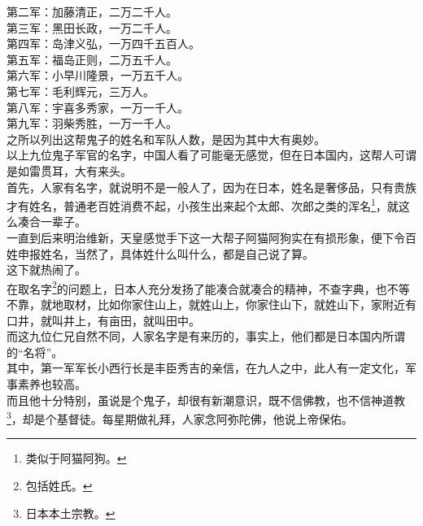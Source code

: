 \begin{multicols}{\theparacolNo}
第二军：加藤清正，二万二千人。\\

第三军：黑田长政，一万二千人。\\

第四军：岛津义弘，一万四千五百人。\\

第五军：福岛正则，二万五千人。\\

第六军：小早川隆景，一万五千人。\\

第七军：毛利辉元，三万人。\\

第八军：宇喜多秀家，一万一千人。\\

第九军：羽柴秀胜，一万一千人。\\

之所以列出这帮鬼子的姓名和军队人数，是因为其中大有奥妙。\\

以上九位鬼子军官的名字，中国人看了可能毫无感觉，但在日本国内，这帮人可谓是如雷贯耳，大有来头。\\

首先，人家有名字，就说明不是一般人了，因为在日本，姓名是奢侈品，只有贵族才有姓名，普通老百姓消费不起，小孩生出来起个太郎、次郎之类的浑名\footnote{类似于阿猫阿狗。}，就这么凑合一辈子。\\

一直到后来明治维新，天皇感觉手下这一大帮子阿猫阿狗实在有损形象，便下令百姓申报姓名，当然了，具体姓什么叫什么，都是自己说了算。\\

这下就热闹了。\\

在取名字\footnote{包括姓氏。}的问题上，日本人充分发扬了能凑合就凑合的精神，不查字典，也不等不靠，就地取材，比如你家住山上，就姓山上，你家住山下，就姓山下，家附近有口井，就叫井上，有亩田，就叫田中。\\

而这九位仁兄自然不同，人家名字是有来历的，事实上，他们都是日本国内所谓的“名将”。\\

其中，第一军军长小西行长是丰臣秀吉的亲信，在九人之中，此人有一定文化，军事素养也较高。\\

而且他十分特别，虽说是个鬼子，却很有新潮意识，既不信佛教，也不信神道教\footnote{日本本土宗教。}，却是个基督徒。每星期做礼拜，人家念阿弥陀佛，他说上帝保佑。\\


\end{multicols}
